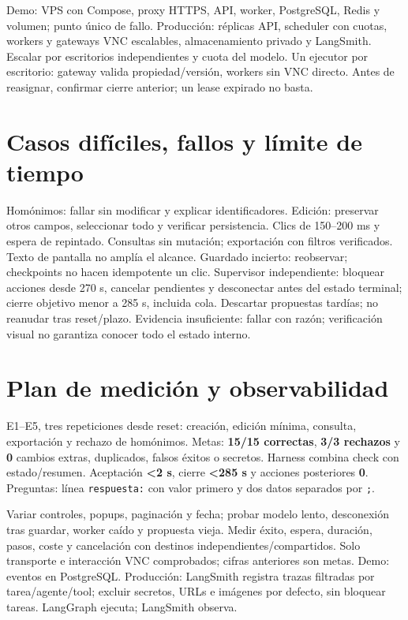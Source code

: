 \documentclass[9pt,a4paper]{extarticle}
\begin{document}
Demo: VPS con Compose, proxy HTTPS, API, worker, PostgreSQL, Redis y volumen; punto único de fallo. Producción: réplicas API, scheduler con cuotas, workers y gateways VNC escalables, almacenamiento privado y LangSmith. Escalar por escritorios independientes y cuota del modelo. Un ejecutor por escritorio: gateway valida propiedad/versión, workers sin VNC directo. Antes de reasignar, confirmar cierre anterior; un lease expirado no basta.

\section{Casos difíciles, fallos y límite de tiempo}
Homónimos: fallar sin modificar y explicar identificadores. Edición: preservar otros campos, seleccionar todo y verificar persistencia. Clics de 150--200 ms y espera de repintado. Consultas sin mutación; exportación con filtros verificados. Texto de pantalla no amplía el alcance. Guardado incierto: reobservar; checkpoints no hacen idempotente un clic. Supervisor independiente: bloquear acciones desde 270 s, cancelar pendientes y desconectar antes del estado terminal; cierre objetivo menor a 285 s, incluida cola. Descartar propuestas tardías; no reanudar tras reset/plazo. Evidencia insuficiente: fallar con razón; verificación visual no garantiza conocer todo el estado interno.

\section{Plan de medición y observabilidad}
E1--E5, tres repeticiones desde reset: creación, edición mínima, consulta, exportación y rechazo de homónimos. Metas: \textbf{15/15 correctas}, \textbf{3/3 rechazos} y \textbf{0} cambios extras, duplicados, falsos éxitos o secretos. Harness combina check con estado/resumen. Aceptación \textbf{<2 s}, cierre \textbf{<285 s} y acciones posteriores \textbf{0}. Preguntas: línea \texttt{respuesta:} con valor primero y dos datos separados por \texttt{;}.

Variar controles, popups, paginación y fecha; probar modelo lento, desconexión tras guardar, worker caído y propuesta vieja. Medir éxito, espera, duración, pasos, coste y cancelación con destinos independientes/compartidos. Solo transporte e interacción VNC comprobados; cifras anteriores son metas. Demo: eventos en PostgreSQL. Producción: LangSmith registra trazas filtradas por tarea/agente/tool; excluir secretos, URLs e imágenes por defecto, sin bloquear tareas. LangGraph ejecuta; LangSmith observa.
\end{document}
